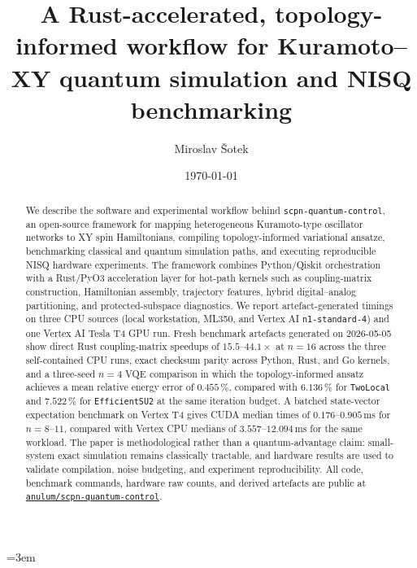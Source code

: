 \documentclass[preprint,aps,physrev,superscriptaddress,floatfix,longbibliography]{revtex4-2}
\begin{document}
\emergencystretch=3em

\title{A Rust-accelerated, topology-informed workflow for Kuramoto--XY
quantum simulation and NISQ benchmarking}

\author{Miroslav \v{S}otek}

\date{\today}

\begin{abstract}
We describe the software and experimental workflow behind
\texttt{scpn-quantum-control}, an open-source framework for mapping
heterogeneous Kuramoto-type oscillator networks to XY spin Hamiltonians,
compiling topology-informed variational ansatze, benchmarking classical
and quantum simulation paths, and executing reproducible NISQ hardware
experiments. The framework combines Python/Qiskit orchestration with a
Rust/PyO3 acceleration layer for hot-path kernels such as coupling-matrix
construction, Hamiltonian assembly, trajectory features, hybrid
digital--analog partitioning, and protected-subspace diagnostics. We report
artefact-generated timings on three CPU sources (local workstation, ML350,
and Vertex AI \texttt{n1-standard-4}) and one Vertex AI Tesla T4 GPU run.
Fresh benchmark artefacts generated on 2026-05-05 show direct
Rust coupling-matrix speedups of $15.5$--$44.1\times$ at $n=16$
across the three self-contained CPU runs, exact checksum parity across
Python, Rust, and Go kernels, and a
three-seed $n=4$ VQE comparison in which the topology-informed ansatz
achieves a mean relative energy error of $0.455\,\%$, compared with
$6.136\,\%$ for \texttt{TwoLocal} and $7.522\,\%$ for
\texttt{EfficientSU2} at the same iteration budget. A batched
state-vector expectation benchmark on Vertex T4 gives CUDA median
times of $0.176$--$0.905\,\mathrm{ms}$ for $n=8$--$11$, compared with
Vertex CPU medians of $3.557$--$12.094\,\mathrm{ms}$ for the same
workload. The paper is
methodological rather than a quantum-advantage claim: small-system exact
simulation remains classically tractable, and hardware results are used
to validate compilation, noise budgeting, and experiment reproducibility.
All code, benchmark commands, hardware raw counts, and derived artefacts are public at
\href{https://github.com/anulum/scpn-quantum-control}{\texttt{anulum/scpn-quantum-control}}.
\end{abstract}

\maketitle
\end{document}
